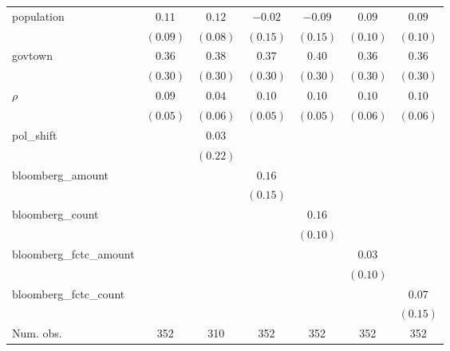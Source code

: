 \begin{table}[!h]
\begin{center}
\begin{tabular}{l c c c c c c }
population              & $0.11$       & $0.12$       & $-0.02$      & $-0.09$      & $0.09$       & $0.09$       \\
                        & $(0.09)$     & $(0.08)$     & $(0.15)$     & $(0.15)$     & $(0.10)$     & $(0.10)$     \\
govtown                 & $0.36$       & $0.38$       & $0.37$       & $0.40$       & $0.36$       & $0.36$       \\
                        & $(0.30)$     & $(0.30)$     & $(0.30)$     & $(0.30)$     & $(0.30)$     & $(0.30)$     \\
$\rho$                  & $0.09$       & $0.04$       & $0.10$       & $0.10$       & $0.10$       & $0.10$       \\
                        & $(0.05)$     & $(0.06)$     & $(0.05)$     & $(0.05)$     & $(0.06)$     & $(0.06)$     \\
pol\_shift              &              & $0.03$       &              &              &              &              \\
                        &              & $(0.22)$     &              &              &              &              \\
bloomberg\_amount       &              &              & $0.16$       &              &              &              \\
                        &              &              & $(0.15)$     &              &              &              \\
bloomberg\_count        &              &              &              & $0.16$       &              &              \\
                        &              &              &              & $(0.10)$     &              &              \\
bloomberg\_fctc\_amount &              &              &              &              & $0.03$       &              \\
                        &              &              &              &              & $(0.10)$     &              \\
bloomberg\_fctc\_count  &              &              &              &              &              & $0.07$       \\
                        &              &              &              &              &              & $(0.15)$     \\
\midrule
Num. obs.               & 352          & 310          & 352          & 352          & 352          & 352          \\

\end{tabular}
\end{center}
\end{table}
